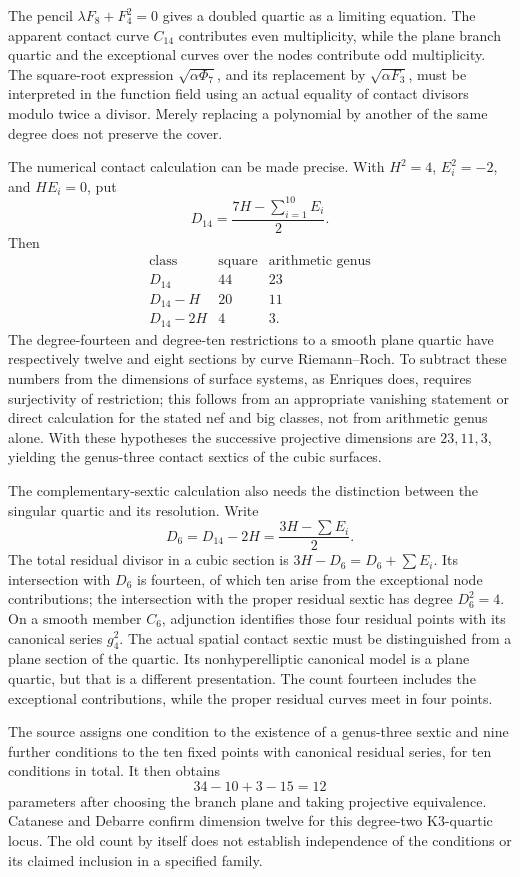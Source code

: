 The pencil \(\lambda F_8+F_4^2=0\) gives a doubled quartic as a limiting equation. The apparent contact curve \(C_{14}\) contributes even multiplicity, while the plane branch quartic and the exceptional curves over the nodes contribute odd multiplicity. The square-root expression \(\sqrt{\alpha\Phi_7}\), and its replacement by \(\sqrt{\alpha F_3}\), must be interpreted in the function field using an actual equality of contact divisors modulo twice a divisor. Merely replacing a polynomial by another of the same degree does not preserve the cover.

The numerical contact calculation can be made precise. With \(H^2=4\), \(E_i^2=-2\), and \(HE_i=0\), put
\[
D_{14}=\frac{7H-\sum_{i=1}^{10}E_i}{2}.
\]
Then
\[
\begin{array}{c|c|c}
\text{class}&\text{square}&\text{arithmetic genus}\\ \hline
D_{14}&44&23\\
D_{14}-H&20&11\\
D_{14}-2H&4&3 .
\end{array}
\]
The degree-fourteen and degree-ten restrictions to a smooth plane quartic have respectively twelve and eight sections by curve Riemann--Roch. To subtract these numbers from the dimensions of surface systems, as Enriques does, requires surjectivity of restriction; this follows from an appropriate vanishing statement or direct calculation for the stated nef and big classes, not from arithmetic genus alone. With these hypotheses the successive projective dimensions are \(23,11,3\), yielding the genus-three contact sextics of the cubic surfaces.

The complementary-sextic calculation also needs the distinction between the singular quartic and its resolution. Write
\[
D_6=D_{14}-2H=\frac{3H-\sum E_i}{2}.
\]
The total residual divisor in a cubic section is \(3H-D_6=D_6+\sum E_i\). Its intersection with \(D_6\) is fourteen, of which ten arise from the exceptional node contributions; the intersection with the proper residual sextic has degree \(D_6^2=4\). On a smooth member \(C_6\), adjunction identifies those four residual points with its canonical series \(g^2_4\). The actual spatial contact sextic must be distinguished from a plane section of the quartic. Its nonhyperelliptic canonical model is a plane quartic, but that is a different presentation. The count fourteen includes the exceptional contributions, while the proper residual curves meet in four points.

The source assigns one condition to the existence of a genus-three sextic and nine further conditions to the ten fixed points with canonical residual series, for ten conditions in total. It then obtains
\[
34-10+3-15=12
\]
parameters after choosing the branch plane and taking projective equivalence. Catanese and Debarre confirm dimension twelve for this degree-two K3-quartic locus. The old count by itself does not establish independence of the conditions or its claimed inclusion in a specified family.

